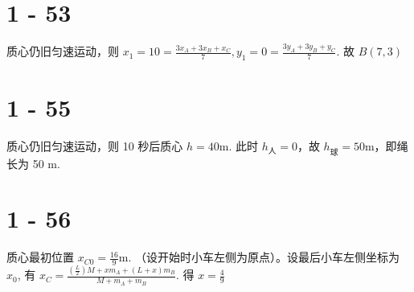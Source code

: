 \documentclass{article}
\begin{document}
\section*{1 - 53}

质心仍旧匀速运动，则 $x_1 = 10 = \frac{3x_A + 3x_B + x_C}{7}, y_1 = 0 = \frac{3y_A + 3y_B + y_C}{7}$. 故 $B(7, 3)$

\section*{1 - 55}

质心仍旧匀速运动，则 10 秒后质心 $h = 40 \mathrm{m}$. 此时 $h_{\text{人}} = 0$，故 $h_{\text{球}} = 50 \mathrm{m}$，即绳长为 50 m.

\section*{1 - 56}

质心最初位置 $x_{C0} = \frac{16}{9} \mathrm{m}$. （设开始时小车左侧为原点）。设最后小车左侧坐标为 $x_0$, 有 $x_C = \frac{\left(\frac{L}{2}\right)M + xm_A + (L + x)m_B}{M + m_A + m_B}$. 得 $x = \frac{4}{9}$
\end{document}
